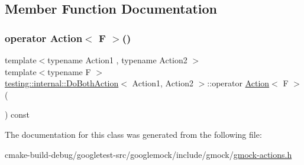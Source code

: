 \subsection{Member Function Documentation}
\mbox{\label{classtesting_1_1internal_1_1DoBothAction_a35733e2f117daad110bfbd3de84634a6}} 
\subsubsection{\texorpdfstring{operator Action$<$ F $>$()}{operator Action< F >()}}
{\footnotesize\ttfamily template$<$typename Action1 , typename Action2 $>$ \\
template$<$typename F $>$ \\
\mbox{\hyperlink{classtesting_1_1internal_1_1DoBothAction}{testing\+::internal\+::\+Do\+Both\+Action}}$<$ Action1, Action2 $>$\+::operator \mbox{\hyperlink{classtesting_1_1Action}{Action}}$<$ F $>$ (\begin{DoxyParamCaption}{ }\end{DoxyParamCaption}) const\hspace{0.3cm}{\ttfamily [inline]}}



The documentation for this class was generated from the following file\+:\begin{DoxyCompactItemize}
\item 
cmake-\/build-\/debug/googletest-\/src/googlemock/include/gmock/\mbox{\hyperlink{gmock-actions_8h}{gmock-\/actions.\+h}}\end{DoxyCompactItemize}
